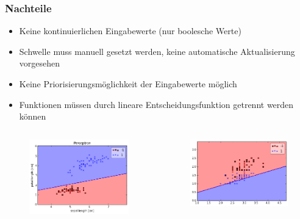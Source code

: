 \begin{frame}
\frametitle{Nachteile}

\begin{itemize}
\item Keine kontinuierlichen Eingabewerte (nur boolesche Werte)
\item Schwelle muss manuell gesetzt werden, keine automatische Aktualisierung vorgesehen
\item Keine Priorisierungsmöglichkeit der Eingabewerte möglich
\item Funktionen müssen durch lineare Entscheidungsfunktion getrennt werden können
\end{itemize}

\begin{columns}
\begin{figure}
	\includegraphics[width=\linewidth]{./geschichtliches/mcCullochPittsNeuron/img/perceptron_klassifizierung1}
\end{figure}

\begin{figure}
	\includegraphics[width=\linewidth]{./geschichtliches/mcCullochPittsNeuron/img/perceptron_klassifizierung2}
\end{figure}



\end{columns}
\end{frame}
